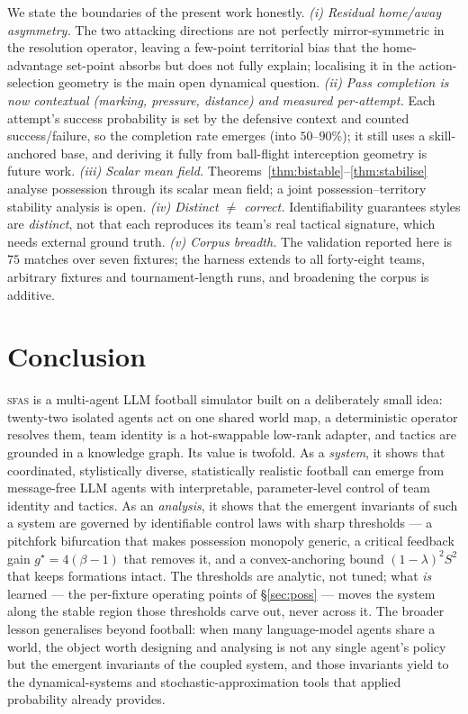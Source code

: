 \documentclass[11pt]{article}
\theoremstyle{definition}
\theoremstyle{remark}
\newcommand{\sfas}{\textsc{sfas}}
\begin{document}
We state the boundaries of the present work honestly. \emph{(i) Residual home/away asymmetry.} The two attacking directions are not perfectly mirror-symmetric in the resolution operator, leaving a few-point territorial bias that the home-advantage set-point absorbs but does not fully explain; localising it in the action-selection geometry is the main open dynamical question. \emph{(ii) Pass completion is now contextual (marking, pressure, distance) and measured per-attempt.} Each attempt's success probability is set by the defensive context and counted success/failure, so the completion rate emerges (into $50$--$90\%$); it still uses a skill-anchored base, and deriving it fully from ball-flight interception geometry is future work. \emph{(iii) Scalar mean field.} Theorems~\ref{thm:bistable}--\ref{thm:stabilise} analyse possession through its scalar mean field; a joint possession--territory stability analysis is open. \emph{(iv) Distinct $\neq$ correct.} Identifiability guarantees styles are \emph{distinct}, not that each reproduces its team's real tactical signature, which needs external ground truth. \emph{(v) Corpus breadth.} The validation reported here is $75$ matches over seven fixtures; the harness extends to all forty-eight teams, arbitrary fixtures and tournament-length runs, and broadening the corpus is additive.

\section{Conclusion}\label{sec:concl}

\sfas{} is a multi-agent LLM football simulator built on a deliberately small idea: twenty-two isolated agents act on one shared world map, a deterministic operator resolves them, team identity is a hot-swappable low-rank adapter, and tactics are grounded in a knowledge graph. Its value is twofold. As a \emph{system}, it shows that coordinated, stylistically diverse, statistically realistic football can emerge from message-free LLM agents with interpretable, parameter-level control of team identity and tactics. As an \emph{analysis}, it shows that the emergent invariants of such a system are governed by identifiable control laws with sharp thresholds --- a pitchfork bifurcation that makes possession monopoly generic, a critical feedback gain $g^\star=4(\beta-1)$ that removes it, and a convex-anchoring bound $(1-\lambda)^2S^2$ that keeps formations intact. The thresholds are analytic, not tuned; what \emph{is} learned --- the per-fixture operating points of \S\ref{sec:poss} --- moves the system along the stable region those thresholds carve out, never across it. The broader lesson generalises beyond football: when many language-model agents share a world, the object worth designing and analysing is not any single agent's policy but the emergent invariants of the coupled system, and those invariants yield to the dynamical-systems and stochastic-approximation tools that applied probability already provides.
\end{document}
